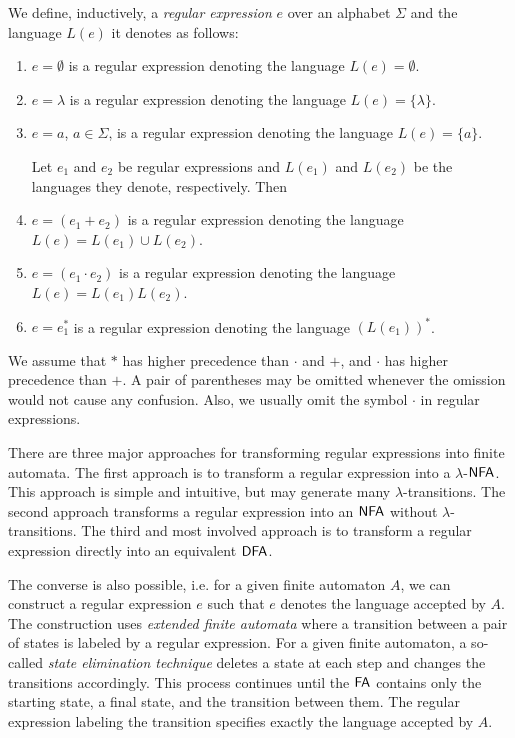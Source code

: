 We define, inductively, a \emph{regular expression} $e$ over an alphabet $\Sigma$ and the language $L(e)$ it denotes as follows:

\begin{enumerate}
\item $e = \emptyset$ is a regular expression denoting the language $L(e) = \emptyset$.
\item $e = \lambda$ is a regular expression denoting the language $L(e) = \{\lambda\}$.
\item $e = a$, $a \in \Sigma$, is a regular expression denoting the language $L(e) = \{a\}$.

Let $e_1$ and $e_2$ be regular expressions and $L(e_1)$ and $L(e_2)$ be the languages they
denote, respectively. Then
\item $e = (e_1 + e_2)$ is a regular expression denoting the language $L(e) = L(e_1) \cup L(e_2)$.
\item $e = (e_1 \cdot e_2)$ is a regular expression denoting the language $L(e) = L(e_1) L(e_2)$.
\item $e = e_1^*$ is a regular expression denoting the language $(L(e_1))^*$.
\end{enumerate}

We assume that $*$ has higher precedence than $\cdot$ and $+$, and $\cdot$ has higher precedence than $+$. A pair of parentheses may be omitted whenever the omission would not cause any confusion. Also, we usually omit the symbol $\cdot$ in regular expressions.

There are three major approaches for transforming regular expressions into finite automata. The first approach is to transform a regular expression into a \index{$\lambda$-$\NFA$} $\lambda$-$\NFA$. This approach is simple and intuitive, but may generate many $\lambda$-transitions. The second approach transforms a regular expression into an \index{$\NFA$}$\NFA$ without $\lambda$-transitions. The third and most involved approach is to transform a regular expression directly into an equivalent \index{$\DFA$}$\DFA$.

The converse is also possible, i.e. for a given finite automaton $A$, we can construct a regular expression $e$ such that $e$ denotes the language accepted by $A$. The construction uses \emph{extended finite automata} where a transition between a pair of states is labeled by a regular expression. For a given finite automaton, a so-called \emph{state elimination technique} deletes a state at each step and changes the transitions accordingly. This process continues until the \index{$\FA$}$\FA$ contains only the starting state, a final state, and the transition between them. The regular expression labeling the transition specifies exactly the language accepted by $A$.

